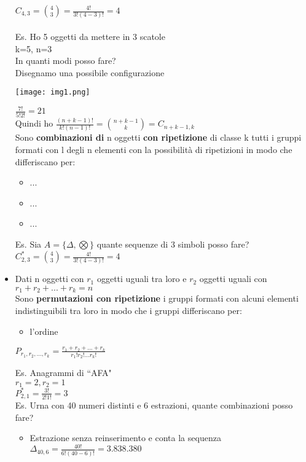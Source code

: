 \documentclass{report}
\begin{document}
\begin{itemize}
    $C_{4,3} = \binom{4}{3} = \frac{4!}{3!(4-3)!} = 4$\\
    \\
    Es. Ho 5 oggetti da mettere in 3 scatole\\
    k=5, n=3\\
    In quanti modi posso fare?\\
    Disegnamo una possibile configurazione
    \begin{center}
      \texttt{[image: img1.png]}
  \end{center}
  $\frac{7!}{5!2!} = 21$\\
  Quindi ho $\frac{(n+k-1)!}{k!(n-1)!}=\binom{n+k-1}{k}=C_{n+k-1,k}$\\
  Sono \textbf{combinazioni di} n oggetti \textbf{con ripetizione} di classe k tutti i gruppi formati con l degli n elementi con la possibilità di ripetizioni in modo che differiscano per:
  \begin{itemize}
    \item ...
    \item ...
    \item ...
    \end{itemize}
    Es. Sia $A=\{\Delta,\bigotimes\}$ quante sequenze di 3 simboli posso fare?\\
    $C_{2,3}^* = \binom{4}{3} = \frac{4!}{3!(4-3)!} = 4$
    \item Dati n oggetti con $r_1$ oggetti uguali tra loro e $r_2$ oggetti uguali con\\
    $r_1+r_2+...+r_k=n$\\
    Sono \textbf{permutazioni con ripetizione} i gruppi formati con alcuni elementi indistinguibili tra loro in modo che i gruppi differiscano per:
    \begin{itemize}
      \item l'ordine\\
      \end{itemize}
      \begin{center}
        $P_{r_1,r_2,...,r_k} = \frac{r_1+r_2+...+r_k}{r_1!r_2!...r_k!}$
    \end{center}
    Es. Anagrammi di ``AFA"\\
    $r_1=2, r_2=1$\\
    $P_{2,1} ^* = \frac{3!}{2!1!} = 3$\\
    Es. Urna con 40 numeri distinti e 6 estrazioni, quante combinazioni posso fare?\\
    \begin{itemize}
      \item Estrazione senza reinserimento e conta la sequenza\\$\Delta_{40,6} = \frac{40!}{6!(40-6)!} = 3.838.380$

\end{itemize}
\end{itemize}
\end{document}
